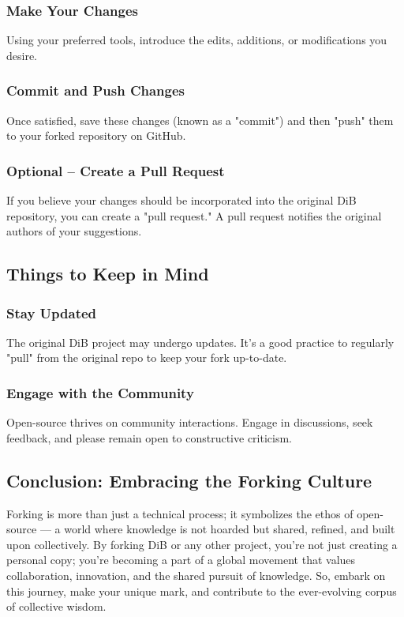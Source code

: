 \documentclass{book}
\begin{document}
\subsubsection*{Make Your Changes}
Using your preferred tools, introduce the edits, additions, or modifications you desire.

\subsubsection*{Commit and Push Changes}
Once satisfied, save these changes (known as a "commit") and then "push" them to your forked repository on GitHub.

\subsubsection*{Optional – Create a Pull Request}
If you believe your changes should be incorporated into the original DiB repository, you can create a "pull request." A pull request notifies the original authors of your suggestions.

\subsection*{Things to Keep in Mind}
\subsubsection*{Stay Updated}
The original DiB project may undergo updates. It's a good practice to regularly "pull" from the original repo to keep your fork up-to-date.

\subsubsection*{Engage with the Community}
Open-source thrives on community interactions. Engage in discussions, seek feedback, and please remain open to constructive criticism.

\subsection*{Conclusion: Embracing the Forking Culture}
Forking is more than just a technical process; it symbolizes the ethos of open-source — a world where knowledge is not hoarded but shared, refined, and built upon collectively. By forking DiB or any other project, you're not just creating a personal copy; you're becoming a part of a global movement that values collaboration, innovation, and the shared pursuit of knowledge. So, embark on this journey, make your unique mark, and contribute to the ever-evolving corpus of collective wisdom.
\end{document}
